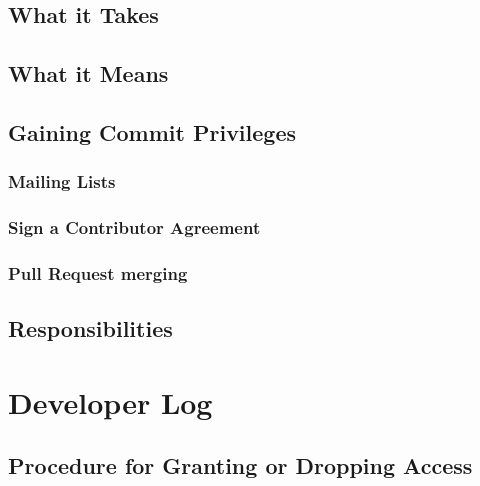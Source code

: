 \documentclass[]{book}
\begin{document}
\hypertarget{what-it-takes}{%
\section{What it Takes}\label{what-it-takes}}

\hypertarget{what-it-means}{%
\section{What it Means}\label{what-it-means}}

\hypertarget{gaining-commit-privileges}{%
\section{Gaining Commit Privileges}\label{gaining-commit-privileges}}

\hypertarget{mailing-lists-2}{%
\subsection{Mailing Lists}\label{mailing-lists-2}}

\hypertarget{sign-a-contributor-agreement}{%
\subsection{Sign a Contributor Agreement}\label{sign-a-contributor-agreement}}

\hypertarget{pull-request-merging}{%
\subsection{Pull Request merging}\label{pull-request-merging}}

\hypertarget{responsibilities}{%
\section{Responsibilities}\label{responsibilities}}

\hypertarget{developer-log}{%
\chapter{Developer Log}\label{developer-log}}

\hypertarget{procedure-for-granting-or-dropping-access}{%
\section{Procedure for Granting or Dropping Access}\label{procedure-for-granting-or-dropping-access}}
\end{document}

